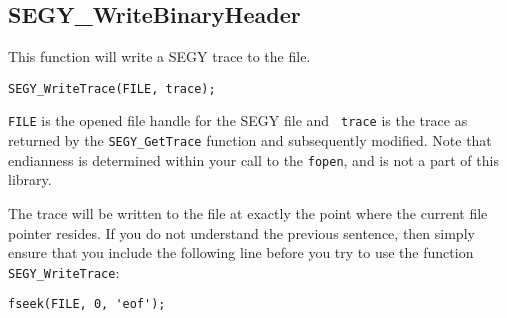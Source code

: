 \documentclass[10pt]{article}
\newcommand{\segy}{{\scriptsize SEGY}\xspace}
\begin{document}
\subsection{SEGY\_WriteBinaryHeader}

This function will write a \segy trace to the file. 

\begin{verbatim}
SEGY_WriteTrace(FILE, trace);
\end{verbatim}

{\tt FILE} is the opened file handle for the \segy file and {\tt
  trace} is the trace as returned by the {\tt SEGY\_GetTrace} function
  and subsequently modified. Note that endianness is determined within
  your call to the {\tt fopen}, and is not a part of this library.

The trace will be written to the file at exactly the point where the
current file pointer resides. If you do not understand the previous
sentence, then simply ensure that you include the following line
before you try to use the function {\tt SEGY\_WriteTrace}:

\begin{verbatim}
fseek(FILE, 0, 'eof');
\end{verbatim}
\end{document}
